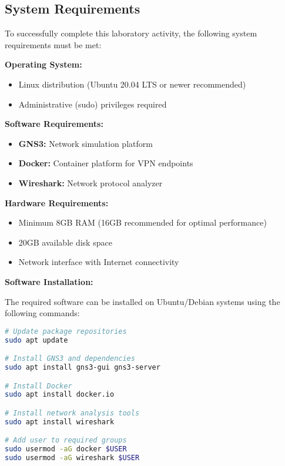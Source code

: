 \subsection{System Requirements}

To successfully complete this laboratory activity, the following system requirements must be met:

\begin{tcolorbox}[colback=blue!5!white,colframe=blue!75!black,title=System Requirements]
\textbf{Operating System:}
\begin{itemize}
    \item Linux distribution (Ubuntu 20.04 LTS or newer recommended)
    \item Administrative (sudo) privileges required
\end{itemize}

\textbf{Software Requirements:}
\begin{itemize}
    \item \textbf{GNS3:} Network simulation platform
    \item \textbf{Docker:} Container platform for VPN endpoints
    \item \textbf{Wireshark:} Network protocol analyzer
\end{itemize}

\textbf{Hardware Requirements:}
\begin{itemize}
    \item Minimum 8GB RAM (16GB recommended for optimal performance)
    \item 20GB available disk space
    \item Network interface with Internet connectivity
\end{itemize}
\end{tcolorbox}

\noindent
\textbf{Software Installation:}

\noindent
The required software can be installed on Ubuntu/Debian systems using the following commands:

\begin{lstlisting}[language=bash]
# Update package repositories
sudo apt update

# Install GNS3 and dependencies
sudo apt install gns3-gui gns3-server

# Install Docker
sudo apt install docker.io

# Install network analysis tools
sudo apt install wireshark

# Add user to required groups
sudo usermod -aG docker $USER
sudo usermod -aG wireshark $USER
\end{lstlisting}

